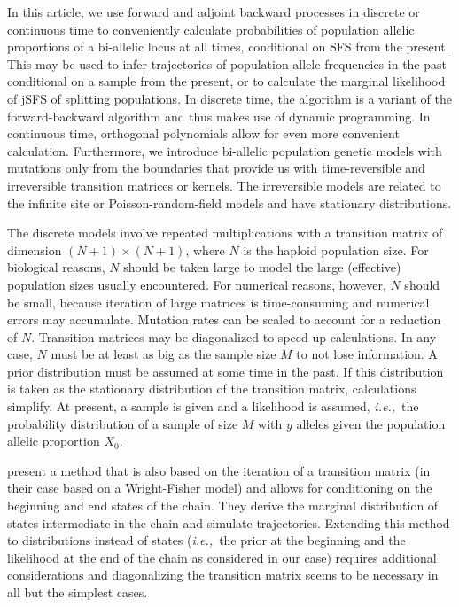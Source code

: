 \documentclass[preprint]{elsarticle}
\newcommand\ie{{\it i.e.,}}
\newcommand\x[1]{\ensuremath{X_{#1}}}
\begin{document}
In this article, we use forward and adjoint backward processes in discrete or continuous time to conveniently calculate probabilities of population allelic proportions of a bi-allelic locus at all times, conditional on SFS from the present. This may be used to infer trajectories of population allele frequencies in the past conditional on a sample from the present, or to calculate the marginal likelihood of jSFS of splitting populations. In discrete time, the algorithm is a variant of the forward-backward algorithm and thus makes use of dynamic programming. In continuous time, orthogonal polynomials allow for even more convenient calculation. Furthermore, we introduce bi-allelic population genetic models with mutations only from the boundaries that provide us with time-reversible and irreversible transition matrices or kernels. The irreversible models are related to the infinite site \citep{Kimu69,Evan07} or Poisson-random-field models \citep{Sawy92} and have stationary distributions.

The discrete models involve repeated multiplications with a transition matrix of dimension $(N+1)\times(N+1)$, where $N$ is the haploid population size. For biological reasons, $N$ should be taken large to model the large (effective) population sizes usually encountered. For numerical reasons, however, $N$ should be small, because iteration of large matrices is time-consuming and numerical errors may accumulate. Mutation rates can be scaled to account for a reduction of $N$. Transition matrices may be diagonalized to speed up calculations. In any case, $N$ must be at least as big as the sample size $M$ to not lose information. A prior distribution must be assumed at some time in the past. If this distribution is taken as the stationary distribution of the transition matrix, calculations simplify. At present, a sample is given and a likelihood is assumed, \ie\ the probability distribution of a sample of size $M$ with $y$ alleles given the population allelic proportion $\x{0}$.

\citet{Zhao14} present a method that is also based on the iteration of a transition matrix (in their case based on a Wright-Fisher model) and allows for conditioning on the beginning and end states of the chain. They derive the marginal distribution of states intermediate in the chain and simulate trajectories. Extending this method to distributions instead of states (\ie\ the prior at the beginning and the likelihood at the end of the chain as considered in our case) requires additional considerations and diagonalizing the transition matrix seems to be necessary in all but the simplest cases. 
\end{document}
